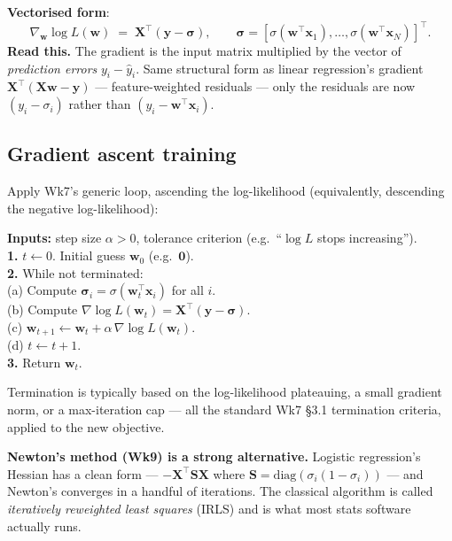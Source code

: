 \documentclass[11pt, a4paper]{article}
\begin{document}
\textbf{Vectorised form}:
\[
\nabla_\mathbf{w}\log L(\mathbf{w}) \;=\; \mathbf{X}^\top(\mathbf{y} - \boldsymbol\sigma), \qquad \boldsymbol\sigma = [\sigma(\mathbf{w}^\top\mathbf{x}_1), \ldots, \sigma(\mathbf{w}^\top\mathbf{x}_N)]^\top.
\]
\textbf{Read this.} The gradient is the input matrix multiplied by the vector of \emph{prediction errors} $y_i - \hat y_i$. Same structural form as linear regression's gradient $\mathbf{X}^\top(\mathbf{X}\mathbf{w} - \mathbf{y})$ — feature-weighted residuals — only the residuals are now $(y_i - \sigma_i)$ rather than $(y_i - \mathbf{w}^\top\mathbf{x}_i)$.

\subsection{Gradient ascent training}

Apply Wk7's generic loop, ascending the log-likelihood (equivalently, descending the negative log-likelihood):

\begin{exbox}
\textbf{Inputs:} step size $\alpha > 0$, tolerance criterion (e.g.\ ``$\log L$ stops increasing'').\\[0.2em]
\textbf{1.} $t \leftarrow 0$. Initial guess $\mathbf{w}_0$ (e.g.\ $\mathbf{0}$).\\
\textbf{2.} While not terminated:\\
\quad\quad (a) Compute $\boldsymbol\sigma_i = \sigma(\mathbf{w}_t^\top\mathbf{x}_i)$ for all $i$.\\
\quad\quad (b) Compute $\nabla\log L(\mathbf{w}_t) = \mathbf{X}^\top(\mathbf{y} - \boldsymbol\sigma)$.\\
\quad\quad (c) $\mathbf{w}_{t+1} \leftarrow \mathbf{w}_t + \alpha\,\nabla\log L(\mathbf{w}_t)$.\\
\quad\quad (d) $t \leftarrow t+1$.\\
\textbf{3.} Return $\mathbf{w}_t$.
\end{exbox}

Termination is typically based on the log-likelihood plateauing, a small gradient norm, or a max-iteration cap — all the standard Wk7 §3.1 termination criteria, applied to the new objective.

\textbf{Newton's method (Wk9) is a strong alternative.} Logistic regression's Hessian has a clean form — $-\mathbf{X}^\top\mathbf{S}\mathbf{X}$ where $\mathbf{S} = \mathrm{diag}(\sigma_i(1-\sigma_i))$ — and Newton's converges in a handful of iterations. The classical algorithm is called \emph{iteratively reweighted least squares} (IRLS) and is what most stats software actually runs.
\end{document}

